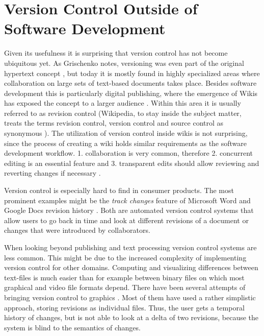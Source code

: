 \section{Version Control Outside of Software Development}
Given its usefulness it is surprising that version control has not become ubiquitous yet. As Grischenko notes, versioning was even part of the original hypertext concept \cite{grishchenko_deep_2010}, but today it is mostly found in highly specialized areas where collaboration on large sets of text-based documents takes place. Besides software development this is particularly digital publishing, where the emergence of Wikis has exposed the concept to a larger audience \cite{priedhorsky_wiki_2011}. Within this area it is usually referred to as revision control (Wikipedia, to stay inside the subject matter, treats the terms revision control, version control and source control as synonymous \cite{_revision_2015}). The utilization of version control inside wikis is not surprising, since the process of creating a wiki holds similar requirements as the software development workflow. 1. collaboration is very common, therefore 2. concurrent editing is an essential feature and 3. transparent edits should allow reviewing and reverting changes if necessary \cite{priedhorsky_wiki_2011}. %

Version control is especially hard to find in consumer products. The most prominent examples might be the \textit{track changes} feature of Microsoft Word \cite{_track_2015} and Google Docs revision history \cite{_see_2015}. Both are automated version control systems that allow users to go back in time and look at different revisions of a document or changes that were introduced by collaborators.

When looking beyond publishing and text processing version control systems are less common. This might be due to the increased complexity of implementing version control for other domains. Computing and visualizing differences between text-files is much easier than for example between binary files on which most graphical and video file formats depend.  There have been several attempts of bringing version control to graphics \cite{nack_new_2009} \cite{_adobe_????} \cite{_introducing_????}. Most of them have used a rather simplistic approach, storing revisions as individual files. Thus, the user gets a temporal history of changes, but is not able to look at a delta of two revisions, because the system is blind to the semantics of changes.

